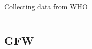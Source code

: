 \documentclass[xcolor=x11names,compress]{beamer}
\renewcommand{\(}{\begin{columns}}
\renewcommand{\)}{\end{columns}}
\newcommand{\<}[1]{\begin{column}{#1}}
\renewcommand{\>}{\end{column}}
\begin{document}
\begin{frame}{Collecting data from WHO}
\begin{columns}[T]
\begin{column}{0.8\textwidth}
\begin{center}
\begin{itemize}

   \end{itemize}
    \end{center}
    \end{column}
\end{columns}
\end{frame}

\subsection{GFW}
\end{document}
